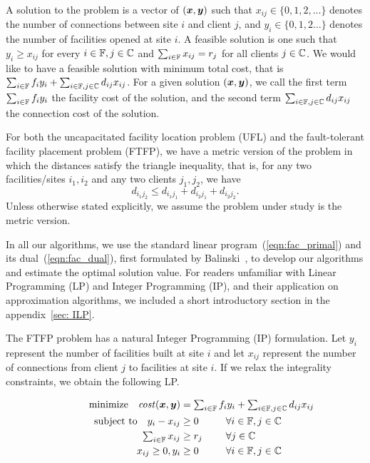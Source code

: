 \documentclass[oneside,final]{ucr}
\begin{document}
A solution to the {\FTFP} problem is a vector of $(\boldsymbol{x},
\boldsymbol{y})$ such that $x_{ij} \in \{0, 1, 2, \ldots\}$ denotes
the number of connections between site $i$ and client $j$,
and $y_i \in \{0, 1, 2\ldots\}$ denotes the number of
facilities opened at site $i$.  A feasible solution is one
such that $y_i \geq x_{ij}$ for every $i \in \mathbb{F}, j
\in \mathbb{C}$ and $\sum_{i\in\mathbb{F}} x_{ij} = r_j$ for
all clients $j \in \mathbb{C}$. We would like to have a
feasible solution with minimum total cost, that is $\sum_{i
  \in \mathbb{F}} f_i y_i + \sum_{i \in \mathbb{F}, j \in
  \mathbb{C}} d_{ij} x_{ij}$. For a given solution
$(\boldsymbol{x},\boldsymbol{y})$, we call the first term $\sum_{i \in
  \mathbb{F}} f_i y_i$ the facility cost of the solution, and
the second term $\sum_{i \in \mathbb{F}, j \in \mathbb{C}}
d_{ij} x_{ij}$ the connection cost of the solution.

For both the uncapacitated facility location problem (UFL)
and the fault-tolerant facility placement problem (FTFP), we
have a metric version of the problem in which the distances
satisfy the triangle inequality, that is, for any two
facilities/sites $i_1,i_2$ and any two clients $j_1,j_2$, we
have
\begin{equation*}
  d_{i_1 j_2} \leq d_{i_1 j_1} + d_{i_2 j_1} + d_{i_2 j_2}.
\end{equation*}
Unless otherwise stated explicitly, we assume the problem
under study is the metric version.

In all our algorithms, we use the standard linear
program~(\ref{eqn:fac_primal}) and its
dual~(\ref{eqn:fac_dual}), first formulated by
Balinski~\cite{Bal66}, to develop our algorithms and
estimate the optimal solution value. For readers unfamiliar
with Linear Programming (LP) and Integer Programming (IP),
and their application on approximation algorithms, we
included a short introductory section in the
appendix~\ref{sec: ILP}.

The FTFP problem has a natural Integer Programming (IP)
formulation. Let $y_i$ represent the number of facilities
built at site $i$ and let $x_{ij}$ represent the number of
connections from client $j$ to facilities at site $i$. If we
relax the integrality constraints, we obtain the following
LP.

\begin{alignat}{3}
  \textrm{minimize} \quad \cost(\bfx,\bfy) &= \textstyle{\sum_{i\in \sitesset}f_iy_i 
								+ \sum_{i\in \sitesset, j\in \clientset}d_{ij}x_{ij}}\label{eqn:fac_primal}\hspace{-1.5in}&&
									\\ \notag
  \textrm{subject to}\quad y_i - x_{ij} &\geq 0 			&\quad 		&\forall i\in \sitesset, j\in \clientset 
									\\ \notag
     \textstyle{\sum_{i\in \sitesset} x_{ij}} &\geq r_j  &			&\forall j\in \clientset
 									\\ \notag
  	  x_{ij} \geq 0, y_i &\geq 0 						& 			&\forall i\in \sitesset, j\in \clientset 
  									\\ \notag
\end{alignat}
\end{document}
